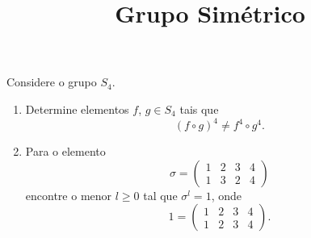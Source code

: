 \documentclass{beamer}
\title{Grupo Simétrico}
\author[\autor]{\autor}
\institute[\instituto]{\instituto}
\date{}
\begin{document}
    \begin{frame}
        \maketitle
    \end{frame}


    \begin{frame}
        \begin{exercicio}
            Considere o grupo $S_4$.
            \begin{enumerate}[label=({\alph*})]
                \item Determine elementos $f$, $g \in S_4$ tais que
                    \[
                        (f \circ g)^4 \ne f^4 \circ g^4.
                    \]
                \item Para o elemento
                    \[
                        \sigma = \begin{pmatrix}
                                    1 & 2 & 3 & 4\\
                                    1 & 3 & 2 & 4
                                 \end{pmatrix}
                    \]
                encontre o menor $l \ge 0$ tal que $\sigma^l = 1$, onde
                \[
                    1 = \begin{pmatrix}
                        1 & 2 & 3 & 4\\
                        1 & 2 & 3 & 4
                    \end{pmatrix}.
                \]
            \end{enumerate}
        \end{exercicio}
    \end{frame}
\end{document}
